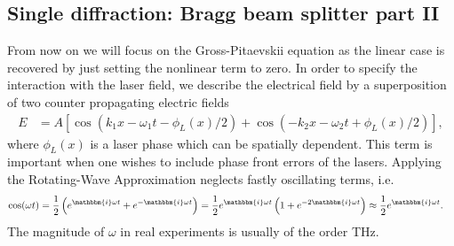 \documentclass[12pt]{article}
\newcommand{\ic}{\mathbbm{i}}
\begin{document}
\subsection{Single diffraction: Bragg beam splitter part II}
From now on we will focus on the Gross-Pitaevskii equation as the linear case is recovered by just setting the nonlinear term to zero.  
In order to specify the interaction with the laser field, we describe the electrical field by a superposition of two counter propagating electric fields
\begin{align}
  E &= A\left[\cos(k_1x-\omega_1 t-\phi_L(x)/2)+\cos(-k_2x-\omega_2 t+\phi_L(x)/2)\right] ,
  \label{eq:efeld}
\end{align}
where $\phi_L(x)$ is a laser phase which can be spatially dependent. This term is important when one wishes to include phase front errors of the lasers. 
Applying the Rotating-Wave Approximation neglects fastly oscillating terms, i.e.
\begin{align}
  \cos(\omega t) &= \frac{1}{2}\left( e^{\ic\omega t}+e^{-\ic\omega t}\right) 
                = \frac{1}{2}e^{\ic\omega t}\left( 1+ e^{-2\ic\omega t}\right) 
                \approx \frac{1}{2}e^{\ic\omega t}.
\end{align}
The magnitude of $\omega$ in real experiments is  usually of the order THz.
\end{document}
